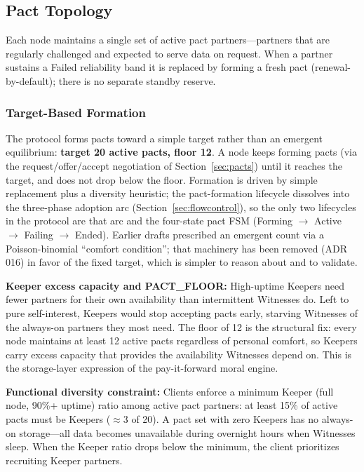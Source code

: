 \documentclass[11pt,a4paper]{article}
\begin{document}
\subsection{Pact Topology}

Each node maintains a single set of active pact partners---partners that are regularly challenged and expected to serve data on request. When a partner sustains a Failed reliability band it is replaced by forming a fresh pact (renewal-by-default); there is no separate standby reserve.

\subsubsection*{Target-Based Formation}

The protocol forms pacts toward a simple target rather than an emergent equilibrium: \textbf{target 20 active pacts, floor 12}. A node keeps forming pacts (via the request/offer/accept negotiation of Section~\ref{sec:pacts}) until it reaches the target, and does not drop below the floor. Formation is driven by simple replacement plus a diversity heuristic; the pact-formation lifecycle dissolves into the three-phase adoption arc (Section~\ref{sec:flowcontrol}), so the only two lifecycles in the protocol are that arc and the four-state pact FSM (Forming $\to$ Active $\to$ Failing $\to$ Ended). Earlier drafts prescribed an emergent count via a Poisson-binomial ``comfort condition''; that machinery has been removed (ADR 016) in favor of the fixed target, which is simpler to reason about and to validate.

\textbf{Keeper excess capacity and PACT\_FLOOR:} High-uptime Keepers need fewer partners for their own availability than intermittent Witnesses do. Left to pure self-interest, Keepers would stop accepting pacts early, starving Witnesses of the always-on partners they most need. The floor of 12 is the structural fix: every node maintains at least 12 active pacts regardless of personal comfort, so Keepers carry excess capacity that provides the availability Witnesses depend on. This is the storage-layer expression of the pay-it-forward moral engine.

\textbf{Functional diversity constraint:} Clients enforce a minimum Keeper (full node, 90\%+ uptime) ratio among active pact partners: at least 15\% of active pacts must be Keepers ($\approx 3$ of 20). A pact set with zero Keepers has no always-on storage---all data becomes unavailable during overnight hours when Witnesses sleep. When the Keeper ratio drops below the minimum, the client prioritizes recruiting Keeper partners.
\end{document}
